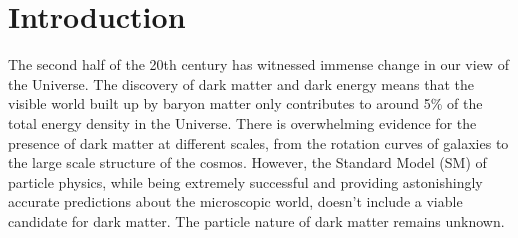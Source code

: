 \documentclass[doublespace,nopageskip]{VTthesis} %
\begin{document}



\mainmatter

\chapter{Introduction} \label{ch:introduction}


The second half of the 20th century has witnessed immense change in our view of the Universe. The discovery of dark matter and dark energy means that the visible world built up by baryon matter only contributes to around 5\% of the total energy density in the Universe. There is overwhelming evidence for the presence of dark matter at different scales, from the rotation curves of galaxies to the large scale structure of the cosmos. However, the Standard Model (SM) of particle physics, while being extremely successful and providing astonishingly accurate predictions about the microscopic world, doesn't include a viable candidate for dark matter. The particle nature of dark matter remains unknown. 
\end{document}
